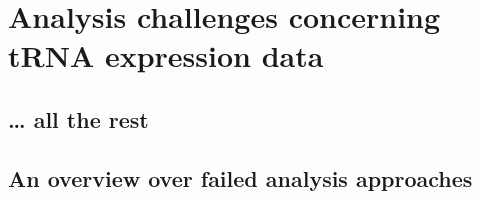 \chapter{Analysis challenges concerning tRNA expression data}

\section{… all the rest}

\section{An overview over failed analysis approaches}
